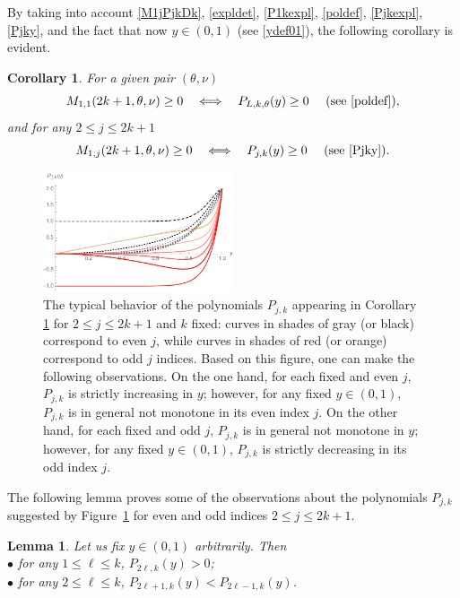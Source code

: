 \documentclass[smallextended,numbook,runningheads]{svjour3}     %
\newtheorem{lemma}{Lemma}
\newtheorem{corollary}{Corollary}
\newtheorem{lemma}{Lemma}
\newtheorem{corollary}{Corollary}
\newcommand{\te}{\theta}
\newcommand{\Pol}{P_{L,k,\te}(y)}
\begin{document}
By taking into account \eqref{M1jPjkDk}, \eqref{expldet}, \eqref{P1kexpl}, \eqref{poldef}, \eqref{Pjkexpl}, \eqref{Pjky}, and the fact that now $y\in(0,1)$ (see \eqref{ydef01}), the following corollary is evident.
\begin{corollary}\label{cor2} For a given pair $(\te,\nu)$
\[
M_{1,1}(2k+1,\te,\nu)\ge 0 \quad \Longleftrightarrow \quad \Pol\ge 0\quad\text{ (see } \eqref{poldef}\text{)},
\]
and for any $2\le j\le 2k+1$
\[
M_{1,j}(2k+1,\te,\nu)\ge 0 \quad \Longleftrightarrow \quad P_{j,k}(y)\ge 0\quad\text{ (see } \eqref{Pjky}\text{)}.
\]
\end{corollary}
\begin{figure}
\begin{center}
\includegraphics[width=0.5\textwidth]{fig_excepttopleft.pdf}
\caption{The typical behavior of the polynomials $P_{j,k}$ appearing in Corollary \ref{cor2} for $2\le j\le 2k+1$ and $k$ fixed: curves in shades of gray (or black) correspond to even $j$, while curves in shades of red (or orange) correspond to odd $j$ indices. Based on this figure, one can make the following observations. On the one hand, for each fixed and even $j$, $P_{j,k}$ is strictly increasing in $y$; however, for any fixed $y\in(0,1)$, $P_{j,k}$ is in general not monotone in its even index $j$. On the other hand, for each fixed and odd $j$, $P_{j,k}$ is in general not monotone in $y$; however, for any fixed $y\in(0,1)$, $P_{j,k}$ is strictly decreasing in its odd index $j$.}\label{fig_excepttopleft}
\end{center}
\end{figure}
The following lemma proves some of the observations about the polynomials $P_{j,k}$ suggested by
Figure~\ref{fig_excepttopleft} for even and odd indices $2\le j\le 2k+1$.
\begin{lemma}\label{lem2} Let us fix $y\in(0,1)$ arbitrarily. Then\\
\indent $\bullet$ for any $1\le\ell\le k$, $P_{2\ell,k}(y)>0$;\\
\indent $\bullet$ for any $2\le\ell\le k$, $P_{2\ell+1,k}(y)<P_{2\ell-1,k}(y)$. 
\end{lemma}
\end{document}
